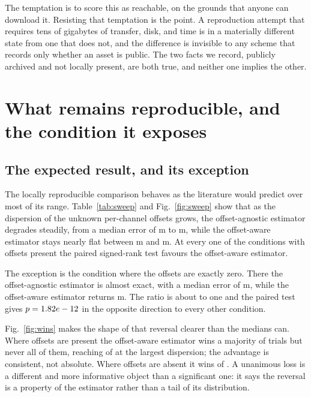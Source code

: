The temptation is to score this as reachable, on the grounds that anyone can
download it. Resisting that temptation is the point. A reproduction attempt that
requires tens of gigabytes of transfer, disk, and time is in a materially
different state from one that does not, and the difference is invisible to any
scheme that records only whether an asset is public. The two facts we record,
publicly archived and not locally present, are both true, and neither one implies
the other.

\section{What remains reproducible, and the condition it exposes}

\subsection{The expected result, and its exception}

The locally reproducible comparison behaves as the literature would predict over
most of its range. Table~\ref{tab:sweep} and Fig.~\ref{fig:sweep} show that as
the dispersion of the unknown per-channel offsets grows, the offset-agnostic
estimator degrades steadily, from a median error of \NaiveRangeLow{} m to
\NaiveRangeHigh{} m, while the offset-aware estimator stays nearly flat between
\AwareFloorLow{} m and \AwareFloorHigh{} m. At every one of the
\NonZeroConditions{} conditions with offsets present the paired signed-rank test
favours the offset-aware estimator.

The exception is the condition where the offsets are exactly zero. There the
offset-agnostic estimator is almost exact, with a median error of
\ZeroNaiveMedian{} m, while the offset-aware estimator returns
\ZeroAwareMedian{} m. The ratio is about \ZeroRatio{} to one and the paired test
gives $p = 1.82e-12{}$ in the opposite direction to every other condition.

Fig.~\ref{fig:wins} makes the shape of that reversal clearer than the medians
can. Where offsets are present the offset-aware estimator wins a majority of
trials but never all of them, reaching \MaxOffsetWins{} of \NTrials{} at the
largest dispersion; the advantage is consistent, not absolute. Where offsets are
absent it wins \ZeroWins{} of \NTrials{}. A unanimous loss is a different and
more informative object than a significant one: it says the reversal is a
property of the estimator rather than a tail of its distribution.

